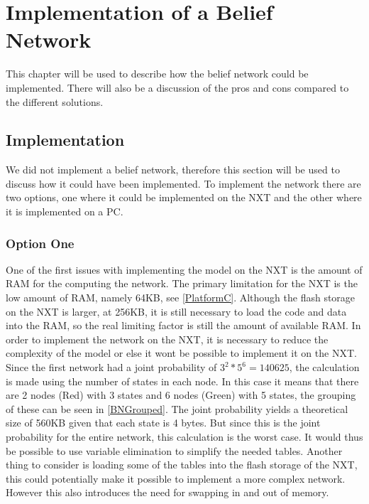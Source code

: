 \chapter{Implementation of a Belief Network}
This chapter will be used to describe how the belief network could be
implemented. There will also be a discussion of the pros and cons compared to
the different solutions.

\section{Implementation}
We did not implement a belief network, therefore this section will be used to
discuss how it could have been implemented. To implement the network there are
two options, one where it could be implemented on the NXT and the other where it is
implemented on a PC.

%

\subsection{Option One}
One of the first issues with implementing the model on the NXT is the amount of
RAM for the computing the network. The primary limitation for the NXT is the
low amount of RAM, namely 64KB, see \autoref{PlatformC}. Although the flash
storage on the NXT is larger, at 256KB, it is still necessary to load the code
and data into the RAM, so the real limiting factor is still the amount of
available RAM. In order to implement the network on the NXT, it is necessary to
reduce the complexity of the model or else it wont be possible to implement it on the NXT.
Since the first network had a joint probability of $3^2*5^6 = 140625$, the
calculation is made using the number of states in each node. In this case it
means that there are 2 nodes (Red) with 3 states and 6 nodes (Green) with 5
states, the grouping of these can be seen in \autoref{BNGrouped}. The joint probability
yields a theoretical size of 560KB given that each state is 4 bytes. But
since this is the joint probability for the entire network, this calculation is
the worst case. It would thus be possible to use variable elimination to simplify the needed
tables. Another thing to consider is loading some of the tables into the flash
storage of the NXT, this could potentially make it possible to implement a more
complex network. However this also introduces the need for swapping in and out
of memory.

